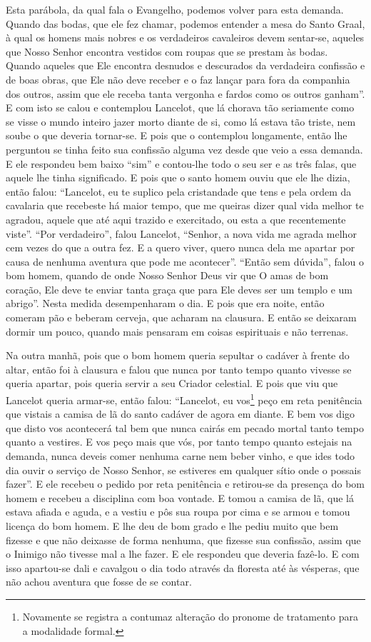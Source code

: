 Esta parábola, da qual fala o Evangelho, podemos volver para esta demanda.
Quando das bodas, que ele fez chamar, podemos entender a mesa do Santo Graal, à
qual os homens mais nobres e os verdadeiros cavaleiros devem sentar-se, aqueles
que Nosso Senhor encontra vestidos com roupas que se prestam às bodas. Quando
aqueles que Ele encontra desnudos e descurados da verdadeira confissão e de
boas obras, que Ele não deve receber e o faz lançar para fora da companhia dos
outros, assim que ele receba tanta vergonha e fardos como os outros ganham”.  E
com isto se calou e contemplou Lancelot, que lá chorava tão seriamente como se
visse o mundo inteiro jazer morto diante de si, como lá estava tão triste, nem
soube o que deveria tornar-se. E pois que o contemplou longamente, então lhe
perguntou se tinha feito sua confissão alguma vez desde que veio a essa
demanda. E ele respondeu bem baixo “sim” e contou-lhe todo o seu ser e as três
falas, que aquele lhe tinha significado. E pois que o santo homem ouviu que ele
lhe dizia, então falou: “Lancelot, eu te suplico pela cristandade que tens e
pela ordem da cavalaria que recebeste há maior tempo, que me queiras dizer qual
vida melhor te agradou, aquele que até aqui trazido e exercitado, ou esta a que
recentemente viste”. “Por verdadeiro”, falou Lancelot, “Senhor, a nova vida me
agrada melhor cem vezes do que a outra fez. E a quero viver, quero nunca dela
me apartar por causa de nenhuma aventura que pode me acontecer”. “Então sem
dúvida”, falou o bom homem, quando de onde Nosso Senhor Deus vir que O amas de
bom coração, Ele deve te enviar tanta graça  que para Ele deves ser um templo e
um abrigo”. Nesta medida desempenharam o dia. E pois que era
noite, então comeram pão e beberam cerveja, que acharam na clausura. E
então se deixaram dormir um pouco, quando mais pensaram em coisas espirituais e
não terrenas.

Na outra manhã, pois que o bom homem queria sepultar o cadáver à frente do
altar, então foi à clausura e falou que nunca por tanto tempo quanto vivesse se
queria apartar, pois queria servir a seu Criador celestial. E pois que viu que
Lancelot queria armar-se, então falou: “Lancelot, eu vos\footnote{ Novamente
se registra a contumaz alteração do pronome de tratamento para a modalidade
formal.} peço em reta penitência que vistais a camisa de lã do
santo cadáver de agora em diante. E bem vos digo que disto vos acontecerá tal
bem que nunca cairás em pecado mortal tanto tempo quanto a vestires. E vos peço
mais que vós, por tanto tempo quanto estejais na demanda, nunca deveis comer
nenhuma carne nem beber vinho, e que ides todo dia ouvir o serviço de Nosso
Senhor,  se estiveres em qualquer sítio onde o possais fazer”. E ele
recebeu o pedido por reta penitência e retirou-se da presença do bom homem e
recebeu a disciplina com boa vontade. E tomou a camisa de lã, que lá estava
afiada e aguda, e a vestiu e pôs sua roupa por cima e se armou e tomou licença
do bom homem. E lhe deu de bom grado e lhe pediu muito que bem fizesse e que
não deixasse de forma nenhuma, que fizesse sua confissão, assim que o Inimigo
não tivesse mal a lhe fazer. E ele respondeu que deveria fazê-lo. E com isso
apartou-se dali e cavalgou o dia todo através da floresta até às vésperas, que
não achou aventura que fosse de se contar. 

